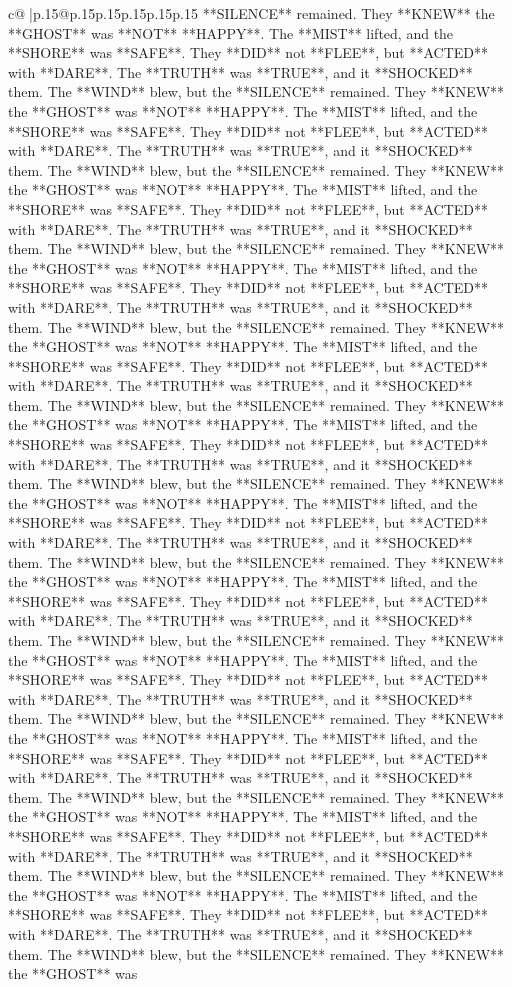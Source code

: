 \documentclass{article}
\begin{document}
{\begin{supertabular}{c@{$\;$}|p{.15\linewidth}@{}p{.15\linewidth}p{.15\linewidth}p{.15\linewidth}p{.15\linewidth}p{.15\linewidth}}
{{{**SILENCE** remained. They **KNEW** the **GHOST** was **NOT** **HAPPY**. The **MIST** lifted, and the **SHORE** was **SAFE**. They **DID** not **FLEE**, but **ACTED** with **DARE**. The **TRUTH** was **TRUE**, and it **SHOCKED** them. The **WIND** blew, but the **SILENCE** remained. They **KNEW** the **GHOST** was **NOT** **HAPPY**. The **MIST** lifted, and the **SHORE** was **SAFE**. They **DID** not **FLEE**, but **ACTED** with **DARE**. The **TRUTH** was **TRUE**, and it **SHOCKED** them. The **WIND** blew, but the **SILENCE** remained. They **KNEW** the **GHOST** was **NOT** **HAPPY**. The **MIST** lifted, and the **SHORE** was **SAFE**. They **DID** not **FLEE**, but **ACTED** with **DARE**. The **TRUTH** was **TRUE**, and it **SHOCKED** them. The **WIND** blew, but the **SILENCE** remained. They **KNEW** the **GHOST** was **NOT** **HAPPY**. The **MIST** lifted, and the **SHORE** was **SAFE**. They **DID** not **FLEE**, but **ACTED** with **DARE**. The **TRUTH** was **TRUE**, and it **SHOCKED** them. The **WIND** blew, but the **SILENCE** remained. They **KNEW** the **GHOST** was **NOT** **HAPPY**. The **MIST** lifted, and the **SHORE** was **SAFE**. They **DID** not **FLEE**, but **ACTED** with **DARE**. The **TRUTH** was **TRUE**, and it **SHOCKED** them. The **WIND** blew, but the **SILENCE** remained. They **KNEW** the **GHOST** was **NOT** **HAPPY**. The **MIST** lifted, and the **SHORE** was **SAFE**. They **DID** not **FLEE**, but **ACTED** with **DARE**. The **TRUTH** was **TRUE**, and it **SHOCKED** them. The **WIND** blew, but the **SILENCE** remained. They **KNEW** the **GHOST** was **NOT** **HAPPY**. The **MIST** lifted, and the **SHORE** was **SAFE**. They **DID** not **FLEE**, but **ACTED** with **DARE**. The **TRUTH** was **TRUE**, and it **SHOCKED** them. The **WIND** blew, but the **SILENCE** remained. They **KNEW** the **GHOST** was **NOT** **HAPPY**. The **MIST** lifted, and the **SHORE** was **SAFE**. They **DID** not **FLEE**, but **ACTED** with **DARE**. The **TRUTH** was **TRUE**, and it **SHOCKED** them. The **WIND** blew, but the **SILENCE** remained. They **KNEW** the **GHOST** was **NOT** **HAPPY**. The **MIST** lifted, and the **SHORE** was **SAFE**. They **DID** not **FLEE**, but **ACTED** with **DARE**. The **TRUTH** was **TRUE**, and it **SHOCKED** them. The **WIND** blew, but the **SILENCE** remained. They **KNEW** the **GHOST** was **NOT** **HAPPY**. The **MIST** lifted, and the **SHORE** was **SAFE**. They **DID** not **FLEE**, but **ACTED** with **DARE**. The **TRUTH** was **TRUE**, and it **SHOCKED** them. The **WIND** blew, but the **SILENCE** remained. They **KNEW** the **GHOST** was **NOT** **HAPPY**. The **MIST** lifted, and the **SHORE** was **SAFE**. They **DID** not **FLEE**, but **ACTED** with **DARE**. The **TRUTH** was **TRUE**, and it **SHOCKED** them. The **WIND** blew, but the **SILENCE** remained. They **KNEW** the **GHOST** was **NOT** **HAPPY**. The **MIST** lifted, and the **SHORE** was **SAFE**. They **DID** not **FLEE**, but **ACTED** with **DARE**. The **TRUTH** was **TRUE**, and it **SHOCKED** them. The **WIND** blew, but the **SILENCE** remained. They **KNEW** the **GHOST** was }}}
\end{supertabular}}
\end{document}
